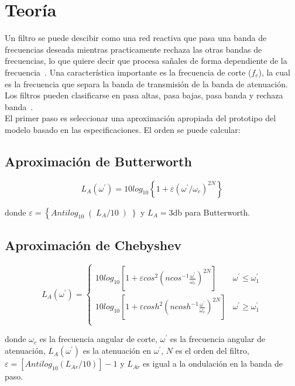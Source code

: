 \section{Teoría}
Un filtro se puede descibir como una red reactiva que pasa una banda de frecuencias deseada mientras practicamente rechaza las otras bandas de frecuencias, lo que quiere decir que procesa sañales de forma dependiente de la frecuencia~\cite{zumbahlen2008581}. Una característica importante es la frecuencia de corte ($f_{c}$), la cual es la frecuencia que separa la banda de transmisión de la banda de atenuación. Los filtros pueden clasificarse en pasa altas, pasa bajas, pasa banda y rechaza banda~\cite{keysight_csc2}. \\

El primer paso es seleccionar una aproximación apropiada del prototipo del modelo basado en las especificaciones. El orden se puede calcular:

\subsection*{Aproximación de Butterworth}
\begin{equation}
    L_{A}(\omega^{'}) = 10 log_{10} \left\{1 + \varepsilon \left( \omega^{'} / \omega_{c} \right)^{2N} \right\}
\end{equation}

donde $\varepsilon = \left\{ Antilog_{10} \right( L_{A} / 10 \left) \right\}$ y $L_{A} = 3$db para Butterworth.


\subsection*{Aproximación de Chebyshev}
\begin{equation}
    L_{A}(\omega^{'}) =
    \begin{cases}
        10 log_{10} \left[ 1 + \varepsilon cos^{2} \left( ncos^{-1} \frac{\omega^{'}}{\omega_{c}} \right)^{2N} \right] & \omega^{'} \leq \omega^{'}_{1} \\
        10 log_{10} \left[ 1 + \varepsilon cosh^{2} \left( ncosh^{-1} \frac{\omega^{'}}{\omega_{c}} \right)^{2N} \right] & \omega^{'} \geq \omega^{'}_{1} \\
    \end{cases}
\end{equation}

donde $\omega_{c}$ es la frecuencia angular de corte, $\omega^{'}$ es la frecuencia angular de atenuación, $L_{A}(\omega^{'})$ es la atenuación en $\omega^{'}$, $N$ es el orden del filtro, $\varepsilon = [Antilog_{10} ( L_{Ar} / 10)] - 1$ y $L_{Ar}$ es igual a la ondulación en la banda de paso. \\


